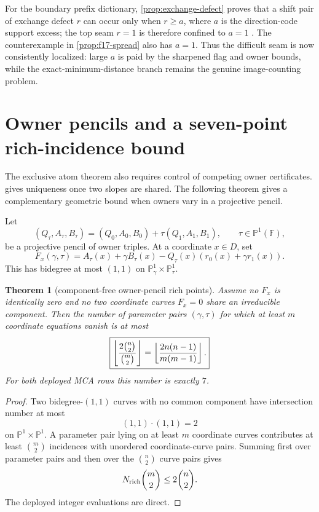 \documentclass[11pt,a4paper]{amsart}
\numberwithin{equation}{section}
\newtheorem{theorem}{Theorem}[section]
\theoremstyle{remark}
\newcommand{\F}{\mathbb F}\newcommand{\B}{\mathbb B}\newcommand{\K}{\mathbb K}\newcommand{\Z}{\mathbb Z}
\begin{document}
\begin{remark}
For the boundary prefix dictionary, \cref{prop:exchange-defect} proves that a shift pair of exchange defect $r$ can occur only when $r\ge a$, where $a$ is the direction-code support excess; the top seam $r=1$ is therefore confined to $a=1$ .  The counterexample in \cref{prop:f17-spread} also has $a=1$.  Thus the difficult seam is now consistently localized: large $a$ is paid by the sharpened flag and owner bounds, while the exact-minimum-distance branch remains the genuine image-counting problem.
\end{remark}

\section{Owner pencils and a seven-point rich-incidence bound}

The exclusive atom theorem also requires control of competing owner certificates.   gives uniqueness once two slopes are shared.  The following theorem gives a complementary geometric bound when owners vary in a projective pencil.

Let
\[
 (Q_\tau,A_\tau,B_\tau)
 =(Q_0,A_0,B_0)+\tau(Q_1,A_1,B_1),
 \qquad \tau\in\mathbb P^1(\F),
\]
be a projective pencil of owner triples.  At a coordinate $x\in D$, set
\[
 F_x(\gamma,\tau)
 =A_\tau(x)+\gamma B_\tau(x)
 -Q_\tau(x)(r_0(x)+\gamma r_1(x)).
\]
This has bidegree at most $(1,1)$ on $\mathbb P^1_\gamma\times\mathbb P^1_\tau$.

\begin{theorem}[component-free owner-pencil rich points]\label{thm:owner-pencil}
Assume no $F_x$ is identically zero and no two coordinate curves $F_x=0$ share an irreducible component.  Then the number of parameter pairs $(\gamma,\tau)$ for which at least $m$ coordinate equations vanish is at most
\[
 \boxed{
 \left\lfloor \frac{2\binom n2}{\binom m2}\right\rfloor
 =\left\lfloor \frac{2n(n-1)}{m(m-1)}\right\rfloor.
 }
\]
For both deployed MCA rows this number is exactly $7$.
\end{theorem}

\begin{proof}
Two bidegree-$(1,1)$ curves with no common component have intersection number at most
\[
 (1,1)\cdot(1,1)=2
\]
on $\mathbb P^1\times\mathbb P^1$.  A parameter pair lying on at least $m$ coordinate curves contributes at least $\binom m2$ incidences with unordered coordinate-curve pairs.  Summing first over parameter pairs and then over the $\binom n2$ curve pairs gives
\[
 N_{\rm rich}\binom m2\le2\binom n2.
\]
The deployed integer evaluations are direct.
\end{proof}
\end{document}
